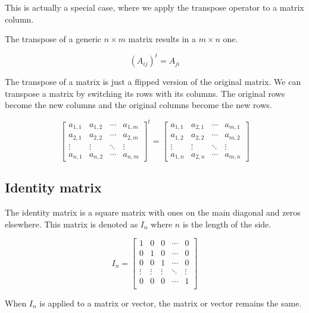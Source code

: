 \documentclass{article}
\begin{document}
This is actually a special case, where we apply the transpose operator to a matrix column.

The transpose of a generic \(n \times m\) matrix results in a \(m \times n\) one.

\[
    {\left(A_{ij}\right)}^t=A_{ji}
\]

The transpose of a matrix is just a flipped version of the original matrix.
We can transpose a matrix by switching its rows with its columns.
The original rows become the new columns and the original columns become the new rows.

\[
    {\begin{bmatrix} 
        a_{1,1} & a_{1,2} & \cdots & a_{1,m} \\
        a_{2,1} & a_{2,2} & \cdots & a_{2,m} \\
        \vdots  & \vdots  & \ddots & \vdots  \\
        a_{n,1} & a_{n,2} & \cdots & a_{n,m} 
    \end{bmatrix}}^t
    =
    \begin{bmatrix} 
        a_{1,1} & a_{2,1} & \cdots & a_{m,1} \\
        a_{1,2} & a_{2,2} & \cdots & a_{m,2} \\
        \vdots  & \vdots  & \ddots & \vdots  \\
        a_{1,n} & a_{2,n} & \cdots & a_{m,n} 
    \end{bmatrix}
\]

\subsection{Identity matrix}

The identity matrix is a square matrix with ones on the main diagonal and zeros elsewhere.
This matrix is denoted as \(I_n\) where \(n\) is the length of the side.

\[
    I_n=
    \begin{bmatrix}
        1 & 0 & 0 & \cdots & 0 \\
        0 & 1 & 0 & \cdots & 0 \\
        0 & 0 & 1 & \cdots & 0 \\
        \vdots & \vdots & \vdots & \ddots & \vdots \\
        0 & 0 & 0 & \cdots & 1 \\
    \end{bmatrix}
\]

When \(I_n\) is applied to a matrix or vector, the matrix or vector remains the same.
\end{document}
